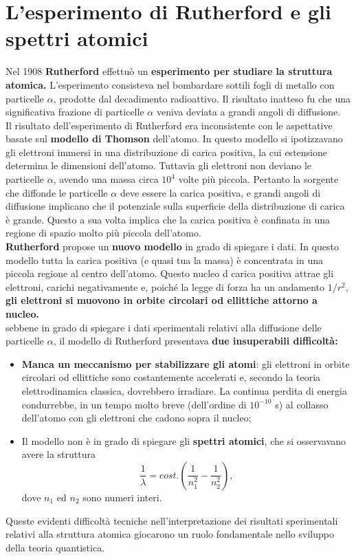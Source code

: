 \section{L'esperimento di Rutherford e gli spettri atomici}
Nel 1908 \textbf{Rutherford} effettuò un \textbf{esperimento per studiare la struttura atomica.} L'esperimento consisteva nel bombardare sottili fogli di metallo con particelle $\alpha$, prodotte dal decadimento radioattivo. Il risultato inatteso fu che una significativa frazione di particelle $\alpha$ veniva deviata a grandi angoli di diffusione.\\
Il risultato dell'esperimento di Rutherford era inconsistente con le aspettative basate sul \textbf{modello di Thomson} dell'atomo. In questo modello si ipotizzavano gli elettroni immersi in una distribuzione di carica positiva, la cui estensione determina le dimensioni dell'atomo. Tuttavia gli elettroni non deviano le particelle $\alpha$, avendo una massa circa $10^4$ volte più piccola. Pertanto la sorgente che diffonde le particelle $\alpha$ deve essere la carica positiva, e grandi angoli di diffusione implicano che il potenziale sulla superficie della distribuzione di carica è grande. Questo a sua volta implica che la carica positiva è confinata in una regione di spazio molto più piccola dell'atomo.\\
\textbf{Rutherford} propose un \textbf{nuovo modello} in grado di spiegare i dati. In questo modello tutta la carica positiva (e quasi tua la massa) è concentrata in una piccola regione al centro dell'atomo. Questo nucleo d carica positiva attrae gli elettroni, carichi negativamente e, poiché la legge di forza ha un andamento $1/r^2$, \textbf{gli elettroni si muovono in orbite circolari od ellittiche attorno a nucleo.}\\
sebbene in grado di spiegare i dati sperimentali relativi alla diffusione delle particelle $\alpha$, il modello di Rutherford presentava \textbf{due insuperabili difficoltà:}
\begin{itemize}
\item \textbf{Manca un meccanismo per stabilizzare gli atomi}: gli elettroni in orbite circolari od ellittiche sono costantemente accelerati e, secondo la teoria elettrodinamica classica, dovrebbero irradiare. La continua perdita di energia condurrebbe, in un tempo molto breve (dell'ordine di $10^{-10}$ s) al collasso dell'atomo con gli elettroni che cadono sopra il nucleo;
\item Il modello non è in grado di spiegare gli \textbf{spettri atomici}, che si osservavano avere la struttura
\begin{equation}
\frac{1}{\lambda} = cost. \left( \frac{1}{n_1 ^2}-\frac{1}{n_2 ^2} \right),
\end{equation}
dove $n_1$ ed $n_2$ sono numeri interi.
\end{itemize}
Queste evidenti difficoltà tecniche nell'interpretazione dei risultati sperimentali relativi alla struttura atomica giocarono un ruolo fondamentale nello sviluppo della teoria quantistica.